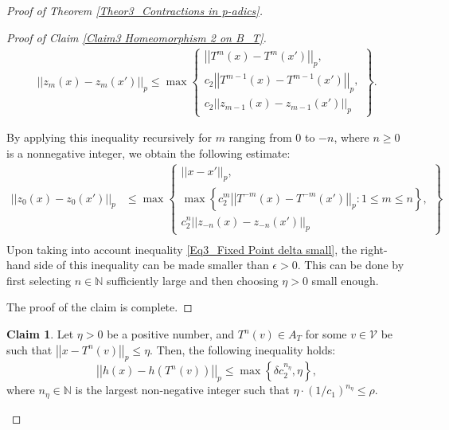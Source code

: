 \documentclass[a4paper, 12pt]{article}
\theoremstyle{definition}
\newtheorem{claim}{Claim}[section]
\begin{document}
\begin{proof}[Proof of Theorem \ref{Theor3_Contractions in p-adics}]
\begin{proof}[Proof of Claim \ref{Claim3 Homeomorphism 2 on B_T}]
			\begin{align*} 
				\left| \left|  z_{m} \left(  x  \right)  - z_{m} \left(  x'  \right)   \right|  \right|_{p}   \le    \max \left\{  \begin{matrix}  \left| \left|  T^{m} \left(  x  \right)  - T^{m} \left(  x'  \right)   \right|  \right|_{p},  \\    c_{2}   \left| \left|  T^{m-1} \left(  x  \right)  - T^{m-1} \left(  x'  \right)   \right|  \right|_{p},  \\ 
					c_{2}  \left| \left|  z_{m-1} \left(  x  \right)  - z_{m-1} \left(  x'  \right)   \right|  \right|_{p} \end{matrix}  \right\}  .
			\end{align*}
			
			By applying this inequality recursively for $m$ ranging from $0$ to $-n$, where $n \ge 0$ is a nonnegative integer, we obtain the following estimate: 
			\begin{align*}
				\left| \left|  z_{0} \left(  x  \right)  - z_{0} \left(  x'  \right)   \right|  \right|_{p}   & \le    \max \left\{  \begin{matrix}   \left| \left|  x - x'  \right|  \right|_{p} ,  \\  
					\max \left\{   c_{2}^{m}  \left| \left|  T^{-m} \left(  x  \right)  - T^{-m} \left(  x'  \right)   \right|  \right|_{p} :   1 \le m \le n  \right\}  ,   \\  
					c_{2}^{n}  \left| \left|  z_{-n} \left(  x  \right)  - z_{-n} \left(  x'  \right)   \right|  \right|_{p} \end{matrix}  \right\}    \\ 
			\end{align*}
			Upon taking into account inequality \eqref{Eq3_Fixed Point delta small}, the right-hand side of this inequality can be made smaller than $ \epsilon  > 0$. This can be done by first selecting $n \in \mathbb{N} $ sufficiently large and then choosing $ \eta  > 0$ small enough. 
			
			The proof of the claim is complete. 
			
			
		\end{proof}
		
		
		\begin{claim}\label{Claim3 Homeomorphism 2 on A_T}
			Let $ \eta  > 0$ be a positive number, and  $T^{n} \left(  v  \right)  \in A_{T}$ for some $v \in \mathcal{V}$  be such that $ \left| \left|  x - T^{n} \left(  v  \right)   \right|  \right|_{p} \le  \eta $. Then, the following inequality holds:  
			$$   \left| \left|  h \left(  x  \right)   - h \left(  T^{n} \left(  v  \right)   \right)   \right|  \right|_{p}    \le     \max \left\{  \delta  c_{2}^{n_{ \eta}} ,    \eta  \right\}  ,$$
			where $n_{ \eta} \in \mathbb{N} $ is the largest non-negative integer such that $   \eta \cdot  \left(  1/ c_{1}  \right) ^{n_{ \eta}} \le \rho $. 
			

\end{claim}
\end{proof}
\end{document}
